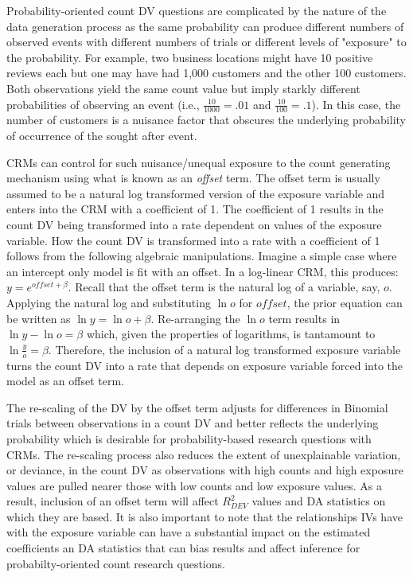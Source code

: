 \documentclass[ShortAfour,times,sageapa]{sagej}
\begin{document}
	Probability-oriented count DV questions are complicated by the nature of the data generation process as the same probability can produce different numbers of observed events with different numbers of trials or different levels of "exposure" to the probability.
	For example, two business locations might have 10 positive reviews each but one may have had 1,000 customers and the other 100 customers.
	Both observations yield the same count value but imply starkly different probabilities of observing an event (i.e., $\frac{10}{1000} = .01$ and $\frac{10}{100} = .1$).
	In this case, the number of customers is a nuisance factor that obscures the underlying probability of occurrence of the sought after event.
	
	CRMs can control for such nuisance/unequal exposure to the count generating mechanism using what is known as an \emph{offset} term.  
	The offset term is usually assumed to be a natural log transformed version of the exposure variable and enters into the CRM with a coefficient of 1.
	The coefficient of 1 results in the count DV being transformed into a rate dependent on values of the exposure variable.
	How the count DV is transformed into a rate with a coefficient of 1 follows from the following algebraic manipulations.
	Imagine a simple case where an intercept only model is fit with an offset.
	In a log-linear CRM, this produces: $y = e^{offset + \beta}$.
	Recall that the offset term is the natural log of a variable, say, $o$.  
	Applying the natural log and substituting $\ln o$ for $offset$, the prior equation can be written as $\ln y = \ln o + \beta$.
	Re-arranging the $\ln o$ term results in $\ln y - \ln o = \beta$ which, given the properties of logarithms, is tantamount to $\ln \frac{y}{o} = \beta$.
	Therefore, the inclusion of a natural log transformed exposure variable turns the count DV into a rate that depends on exposure variable forced into the model as an offset term.
	
	The re-scaling of the DV by the offset term adjusts for differences in Binomial trials between observations in a count DV and better reflects the underlying probability which is desirable for probability-based research questions with CRMs.
	The re-scaling process also reduces the extent of unexplainable variation, or deviance, in the count DV as observations with high counts and high exposure values are pulled nearer those with low counts and low exposure values.	
	As a result, inclusion of an offset term will affect $R^2_{DEV}$ values and DA statistics on which they are based.
	It is also important to note that the relationships IVs have with the exposure variable can have a substantial impact on the estimated coefficients an DA statistics that can bias results and affect inference for probabilty-oriented count research questions.
	
\end{document}
